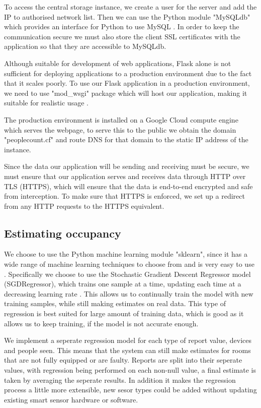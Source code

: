 \documentclass{l4proj}
\begin{document}
To access the central storage instance, we create a user for the server and add the IP to authorised network list. Then we can use the Python module "MySQLdb" which provides an interface for Python to use MySQL \cite{c-mysqldb}. In order to keep the communication secure we must also store the client SSL certificates with the application so that they are accessible to MySQLdb.

Although suitable for development of web applications, Flask alone is not sufficient for deploying applications to a production environment due to the fact that it scales poorly. To use our Flask application in a production environment, we need to use "mod\_wsgi" package which will host our application, making it suitable for realistic usage \cite{c-wsgi}.

The production environment is installed on a Google Cloud compute engine\cite{c-gcloud} which serves the webpage, to serve this to the public we obtain the domain "peoplecount.cf" and route DNS for that domain to the static IP address of the instance.

Since the data our application will be sending and receiving must be secure, we must ensure that our application serves and receives data through HTTP over TLS (HTTPS), which will ensure that the data is end-to-end encrypted and safe from interception.
To make sure that HTTPS is enforced, we set up a redirect from any HTTP requests to the HTTPS equivalent.

\subsection{Estimating occupancy}

We choose to use the Python machine learning module "sklearn", since it has a wide range of machine learning techniques to choose from and is very easy to use \cite{c-sklearn}. Specifically we choose to use the Stochastic Gradient Descent Regressor model (SGDRegressor), which trains one sample at a time, updating each time at a decreasing learning rate \cite{c-sgdreg}. This allows us to continually train the model with new training samples, while still making estimates on real data. This type of regression is best suited for large amount of training data, which is good as it allows us to keep training, if the model is not accurate enough.

We implement a seperate regression model for each type of report value, devices and people seen. This means that the system can still make estimates for rooms that are not fully equipped or are faulty. Reports are split into their seperate values, with regression being performed on each non-null value, a final estimate is taken by averaging the seperate results. In addition it makes the regression process a little more extensible, new sesor types could be added without updating existing smart sensor hardware or software.
\end{document}
